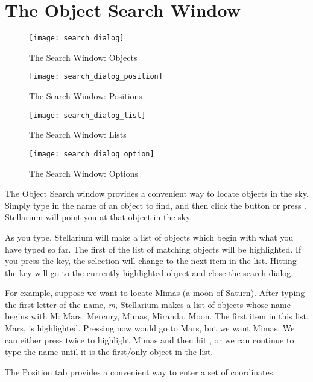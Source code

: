 \section{The Object Search Window}
\label{sec:gui:search}

\begin{figure}[p]
\centering\texttt{[image: search\_dialog]}
\caption{The Search Window: Objects}
\label{fig:gui:search}
\end{figure}

\begin{figure}[p]
\centering\texttt{[image: search\_dialog\_position]}
\caption{The Search Window: Positions}
\label{fig:gui:search:position}
\end{figure}

\begin{figure}[p]
\centering\texttt{[image: search\_dialog\_list]}
\caption{The Search Window: Lists}
\label{fig:gui:search:lists}
\end{figure}


\begin{figure}[p]
\centering\texttt{[image: search\_dialog\_option]}
\caption{The Search Window: Options}
\label{fig:gui:search:options}
\end{figure}

The Object Search window provides a convenient way to locate objects in
the sky. Simply type in the name of an object to find, and then click
the  button or press \key{\return}. Stellarium will point you at that
object in the sky.

As you type, Stellarium will make a list of objects which begin with
what you have typed so far. The first of the list of matching objects
will be highlighted. If you press the \key{\tab} key, the selection will change
to the next item in the list. Hitting the \key{\return} key will go to the
currently highlighted object and close the search dialog.

For example, suppose we want to locate Mimas (a moon of Saturn). After
typing the first letter of the name, \emph{m}, Stellarium makes a list
of objects whose name begins with M: Mars, Mercury, Mimas, Miranda,
Moon. The first item in this list, Mars, is highlighted. Pressing \key{\return}
now would go to Mars, but we want Mimas. We can either press \key{\tab} twice
to highlight Mimas and then hit \key{\return}, or we can continue to type the
name until it is the first/only object in the list.


The Position tab provides a convenient way to enter a set
of coordinates.


